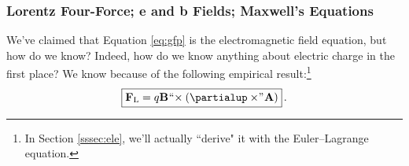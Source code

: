 \documentclass[12pt]{article}
\renewcommand{\vv}[1]{\mathbf{#1}}
\begin{document}
\subsubsection[Lorentz Four-Force; e and b Fields; Maxwell’s Equations]{Lorentz Four-Force; e and b Fields; Maxwell's Equations}\label{sssec:lff}

We've claimed that Equation \ref{eq:gfp} is the electromagnetic field equation, but how do we know? Indeed, how do we know anything about electric charge in the first place? We know because of the following empirical result:\footnote{In Section \ref{sssec:ele}, we'll actually ``derive" it with the Euler--Lagrange equation.}
\begin{equation}\label{eq:ff}
\boxed{\vv F_{\textrm{L}} = q \vv B \mkern1mu `` \mkern-4mu \times (\partialup \times \mkern-4mu " \mkern1mu \vv A)} \, .
\end{equation}
\end{document}
